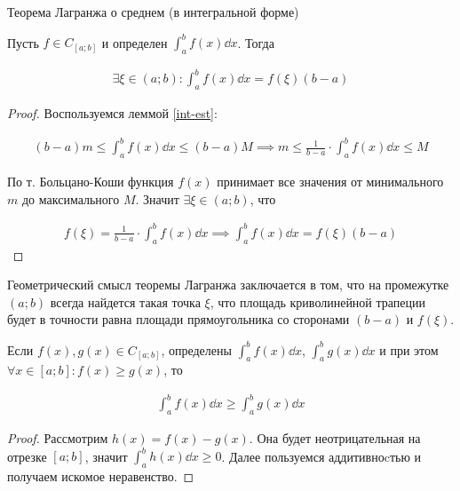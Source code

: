 \begin{theorem}\label{L-mid-int}
  Теорема Лагранжа о среднем (в интегральной форме)

  Пусть \(f \in C_{[a;b]}\) и определен \(\int_{a}^{b} f(x) \dd x\). Тогда

  \begin{align*}
    \exists \xi \in (a; b) \colon \int_{a}^{b} f(x) \dd x = f(\xi) (b - a)
  \end{align*}
\end{theorem}
\begin{proof}
  Воспользуемся леммой \ref{int-est}:

  \begin{align*}
    (b - a) m \le \int_{a}^{b} f(x) \dd x \le (b - a) M
    \implies m \le \frac{1}{b - a} \cdot \int_{a}^{b} f(x) \dd x \le M
  \end{align*}

  По т. Больцано-Коши функция \(f(x)\) принимает все значения от минимального
  \(m\) до максимального \(M\). Значит \(\exists \xi \in (a; b)\), что

  \begin{align*}
    f(\xi) = \frac{1}{b - a} \cdot \int_{a}^{b} f(x) \dd x
    \implies \int_{a}^{b} f(x) \dd x = f(\xi) (b - a)
  \end{align*}
\end{proof}

\begin{remark}
  Геометрический смысл теоремы Лагранжа заключается в том, что на промежутке
  \((a; b)\) всегда найдется такая точка \(\xi\), что площадь криволинейной
  трапеции будет в точности равна площади прямоугольника со сторонами
  \((b - a)\) и \(f(\xi)\).
\end{remark}

\begin{lemma}
  Если \(f(x), g(x) \in C_{[a; b]}\), определены
  \(\int_{a}^{b} f(x) \dd x\), \(\int_{a}^{b} g(x) \dd x\)
  и при этом
  \(\forall x \in [a; b] \colon f(x) \ge g(x)\), то

  \begin{align*}
    \int_{a}^{b} f(x) \dd x \ge \int_{a}^{b} g(x) \dd x
  \end{align*}
\end{lemma}
\begin{proof}
  Рассмотрим \(h(x) = f(x) - g(x)\). Она будет неотрицательная на отрезке
  \([a; b]\), значит \(\int_{a}^{b} h(x) \dd x \ge 0\). Далее пользуемся
  аддитивноcтью и получаем искомое неравенство.
\end{proof}

